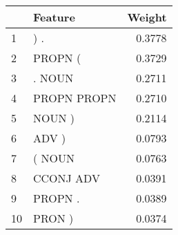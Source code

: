 \begin{tabular}{llr}
\toprule
{} &      Feature &  Weight \\
\midrule
1  &          ) . &  0.3778 \\
2  &      PROPN ( &  0.3729 \\
3  &       . NOUN &  0.2711 \\
4  &  PROPN PROPN &  0.2710 \\
5  &       NOUN ) &  0.2114 \\
6  &        ADV ) &  0.0793 \\
7  &       ( NOUN &  0.0763 \\
8  &    CCONJ ADV &  0.0391 \\
9  &      PROPN . &  0.0389 \\
10 &       PRON ) &  0.0374 \\
\bottomrule
\end{tabular}
